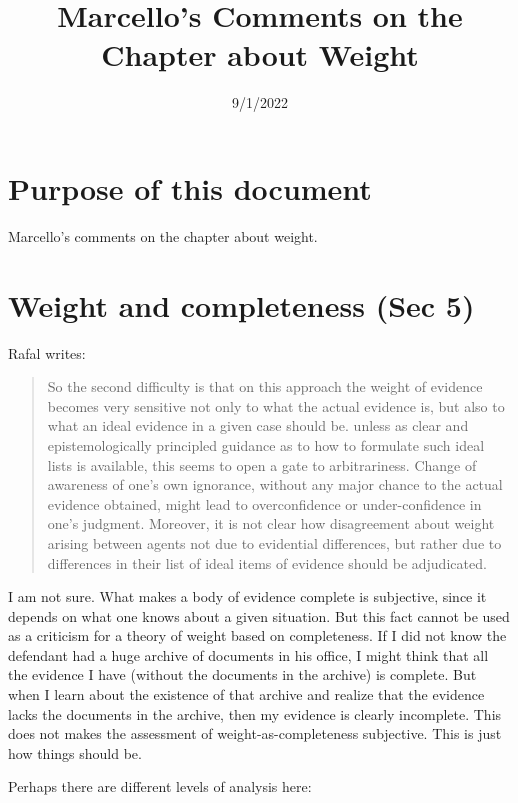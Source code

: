 \documentclass[
  10pt,
  dvipsnames,enabledeprecatedfontcommands]{scrartcl}
\title{Marcello's Comments on the Chapter about Weight}
\author{}
\date{\vspace{-2.5em}9/1/2022}
\begin{document}
\maketitle

\hypertarget{purpose-of-this-document}{%
\section{Purpose of this document}\label{purpose-of-this-document}}

Marcello's comments on the chapter about weight.

\hypertarget{weight-and-completeness-sec-5}{%
\section{Weight and completeness (Sec
5)}\label{weight-and-completeness-sec-5}}

Rafal writes:

\begin{quote}
So the second difficulty is that on this approach the weight of evidence becomes very sensitive not only to what the actual evidence is, but also to what an ideal evidence in a given case should be. unless as clear and epistemologically principled guidance as to how to formulate such ideal lists is available, this seems to open a gate to arbitrariness. Change of awareness of one’s own ignorance, without any major chance to the actual evidence obtained, might lead to overconfidence or under-confidence in one’s judgment. Moreover, it is not clear how disagreement about weight arising between agents not due to evidential differences, but rather due to differences in their list of ideal items of evidence should be adjudicated.
\end{quote}

I am not sure. What makes a body of evidence complete is subjective,
since it depends on what one knows about a given situation. But this
fact cannot be used as a criticism for a theory of weight based on
completeness. If I did not know the defendant had a huge archive of
documents in his office, I might think that all the evidence I have
(without the documents in the archive) is complete. But when I learn
about the existence of that archive and realize that the evidence lacks
the documents in the archive, then my evidence is clearly incomplete.
This does not makes the assessment of weight-as-completeness subjective.
This is just how things should be.

Perhaps there are different levels of analysis here:
\end{document}
